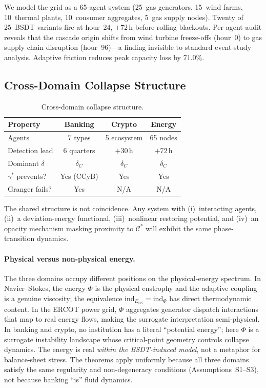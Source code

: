\documentclass[final]{siamltex}
\newcommand{\Ebs}{E_{\mathrm{BS}}}
\newcommand{\Cman}{\mathcal{C}^*}
\begin{document}
We model the grid as a 65-agent system (25~gas generators, 15~wind
farms, 10~thermal plants, 10~consumer aggregates, 5~gas supply
nodes). Twenty of 25~BSDT variants fire at hour~24, $+72$\,h before
rolling blackouts. Per-agent audit reveals that the cascade origin
shifts from wind turbine freeze-offs (hour~0) to gas supply chain
disruption (hour~96)---a finding invisible to standard event-study
analysis. Adaptive friction reduces peak capacity loss by 71.0\%.

\subsection{Cross-Domain Collapse Structure}

\begin{table}[htbp]
\centering
\caption{Cross-domain collapse structure.}
\label{tab:universal}
\begin{tabular}{@{}lccc@{}}
\toprule
Property & Banking & Crypto & Energy\\
\midrule
Agents & 7 types & 5 ecosystem & 65 nodes\\
Detection lead & 6 quarters & $+30$\,h & $+72$\,h\\
Dominant $\delta$ & $\delta_C$ & $\delta_C$ & $\delta_C$\\
$\gamma^*$ prevents? & Yes (CCyB) & Yes & Yes\\
Granger fails? & Yes & N/A & N/A\\
\bottomrule
\end{tabular}
\end{table}

The shared structure is not coincidence.  Any system with (i)~interacting
agents, (ii)~a deviation-energy functional, (iii)~nonlinear
restoring potential, and (iv)~an opacity mechanism masking proximity
to $\Cman$ will exhibit the same phase-transition dynamics.

\paragraph{Physical versus non-physical energy.}
The three domains occupy different positions on the
physical-energy spectrum.
In Navier--Stokes, the energy $\Phi$ is the physical enstrophy and
the adaptive coupling is a genuine viscosity; the equivalence
$\mathrm{ind}_{\Ebs} = \mathrm{ind}_\Phi$ has direct thermodynamic
content.
In the ERCOT power grid, $\Phi$ aggregates generator dispatch
interactions that map to real energy flows, making the surrogate
interpretation semi-physical.
In banking and crypto, no institution has a literal ``potential
energy''; here $\Phi$ is a surrogate instability landscape whose
critical-point geometry controls collapse dynamics.  The energy
is real \emph{within the BSDT-induced model}, not a metaphor for
balance-sheet stress.  The theorems apply uniformly because all
three domains satisfy the same regularity and non-degeneracy
conditions (Assumptions~S1--S3), not because banking ``is''
fluid dynamics.
\end{document}
